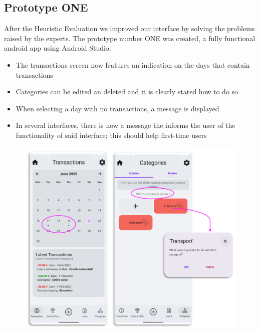 \documentclass[a4paper,12pt]{article}
\begin{document}
\subsection{Prototype ONE}
After the Heuristic Evaluation we improved our interface by solving the problems raised by the experts. The prototype number ONE was created, a fully functional android app using Android Studio.
\begin{itemize}
    \item The transactions screen now features an indication on the days that contain transactions
    \item Categories can be edited an deleted and it is clearly stated how to do so
    \item When selecting a day with no transactions, a message is displayed
    \item In several interfaces, there is now a message the informs the user of the functionality of said interface; this should help first-time users
\end{itemize}
\begin{figure}[H]
    \centering
    \includegraphics[scale=0.6]{HEres.png}
\end{figure}
\end{document}
